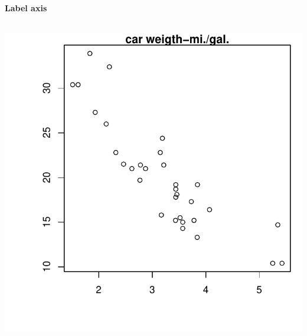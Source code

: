 \documentclass[8pt]{beamer}
\begin{document}

\begin{frame}
\frametitle{\insertsection}
\framesubtitle{Label axis}

\begin{columns}
\centering
\includegraphics[width=0.9\linewidth]{label_axis_nl}


\centering
{}

\end{columns}

\end{frame}
\end{document}
